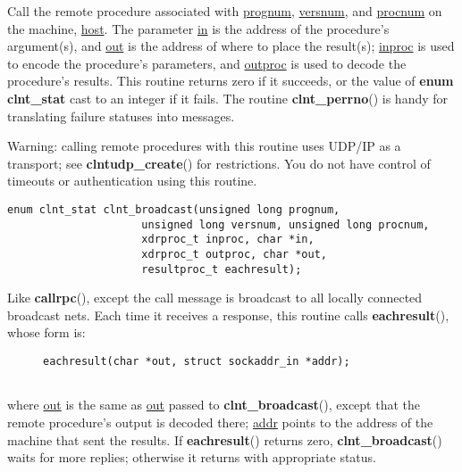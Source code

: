 \documentclass[]{article}
\let\realtextbf=\textbf
\renewcommand{\textbf}[1]{\textcolor{boldcolor}{\realtextbf{#1}}}
\renewcommand{\emph}[1]{\underline{#1}}
\begin{document}
\begin{description}
\itemsep1pt\parskip0pt
\item[]
Call the remote procedure associated with \emph{prognum},
\emph{versnum}, and \emph{procnum} on the machine, \emph{host}. The
parameter \emph{in} is the address of the procedure's argument(s), and
\emph{out} is the address of where to place the result(s); \emph{inproc}
is used to encode the procedure's parameters, and \emph{outproc} is used
to decode the procedure's results. This routine returns zero if it
succeeds, or the value of \textbf{enum clnt\_stat} cast to an integer if
it fails. The routine \textbf{clnt\_perrno}() is handy for translating
failure statuses into messages.
\end{description}

\begin{description}
\itemsep1pt\parskip0pt
\item[]
Warning: calling remote procedures with this routine uses UDP/IP as a
transport; see \textbf{clntudp\_create}() for restrictions. You do not
have control of timeouts or authentication using this routine.
\end{description}

\begin{verbatim}
enum clnt_stat clnt_broadcast(unsigned long prognum,
                     unsigned long versnum, unsigned long procnum,
                     xdrproc_t inproc, char *in,
                     xdrproc_t outproc, char *out,
                     resultproc_t eachresult);
\end{verbatim}

\begin{description}
\itemsep1pt\parskip0pt
\item[]
Like \textbf{callrpc}(), except the call message is broadcast to all
locally connected broadcast nets. Each time it receives a response, this
routine calls \textbf{eachresult}(), whose form is:
\end{description}

\begin{description}
\item[]
\begin{verbatim}
eachresult(char *out, struct sockaddr_in *addr);
    
\end{verbatim}
\end{description}

\begin{description}
\itemsep1pt\parskip0pt
\item[]
where \emph{out} is the same as \emph{out} passed to
\textbf{clnt\_broadcast}(), except that the remote procedure's output is
decoded there; \emph{addr} points to the address of the machine that
sent the results. If \textbf{eachresult}() returns zero,
\textbf{clnt\_broadcast}() waits for more replies; otherwise it returns
with appropriate status.
\end{description}
\end{document}
